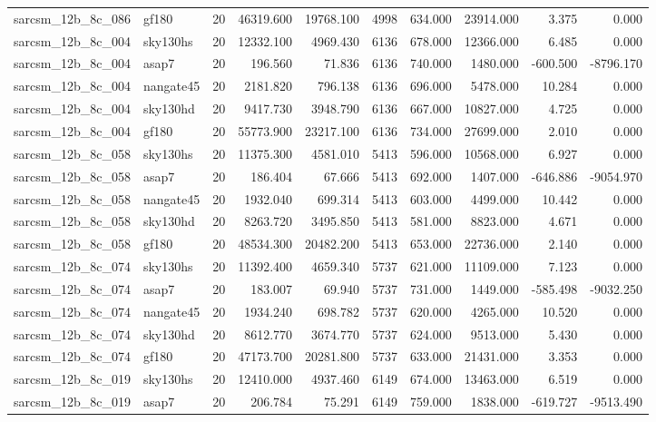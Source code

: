 \documentclass{article}
\begin{document}
\begin{longtable}{llrrrrrrrr}
sarcsm\_12b\_8c\_086 & gf180 & 20 & 46319.600 & 19768.100 & 4998 & 634.000 & 23914.000 & 3.375 & 0.000 \\
sarcsm\_12b\_8c\_004 & sky130hs & 20 & 12332.100 & 4969.430 & 6136 & 678.000 & 12366.000 & 6.485 & 0.000 \\
sarcsm\_12b\_8c\_004 & asap7 & 20 & 196.560 & 71.836 & 6136 & 740.000 & 1480.000 & -600.500 & -8796.170 \\
sarcsm\_12b\_8c\_004 & nangate45 & 20 & 2181.820 & 796.138 & 6136 & 696.000 & 5478.000 & 10.284 & 0.000 \\
sarcsm\_12b\_8c\_004 & sky130hd & 20 & 9417.730 & 3948.790 & 6136 & 667.000 & 10827.000 & 4.725 & 0.000 \\
sarcsm\_12b\_8c\_004 & gf180 & 20 & 55773.900 & 23217.100 & 6136 & 734.000 & 27699.000 & 2.010 & 0.000 \\
sarcsm\_12b\_8c\_058 & sky130hs & 20 & 11375.300 & 4581.010 & 5413 & 596.000 & 10568.000 & 6.927 & 0.000 \\
sarcsm\_12b\_8c\_058 & asap7 & 20 & 186.404 & 67.666 & 5413 & 692.000 & 1407.000 & -646.886 & -9054.970 \\
sarcsm\_12b\_8c\_058 & nangate45 & 20 & 1932.040 & 699.314 & 5413 & 603.000 & 4499.000 & 10.442 & 0.000 \\
sarcsm\_12b\_8c\_058 & sky130hd & 20 & 8263.720 & 3495.850 & 5413 & 581.000 & 8823.000 & 4.671 & 0.000 \\
sarcsm\_12b\_8c\_058 & gf180 & 20 & 48534.300 & 20482.200 & 5413 & 653.000 & 22736.000 & 2.140 & 0.000 \\
sarcsm\_12b\_8c\_074 & sky130hs & 20 & 11392.400 & 4659.340 & 5737 & 621.000 & 11109.000 & 7.123 & 0.000 \\
sarcsm\_12b\_8c\_074 & asap7 & 20 & 183.007 & 69.940 & 5737 & 731.000 & 1449.000 & -585.498 & -9032.250 \\
sarcsm\_12b\_8c\_074 & nangate45 & 20 & 1934.240 & 698.782 & 5737 & 620.000 & 4265.000 & 10.520 & 0.000 \\
sarcsm\_12b\_8c\_074 & sky130hd & 20 & 8612.770 & 3674.770 & 5737 & 624.000 & 9513.000 & 5.430 & 0.000 \\
sarcsm\_12b\_8c\_074 & gf180 & 20 & 47173.700 & 20281.800 & 5737 & 633.000 & 21431.000 & 3.353 & 0.000 \\
sarcsm\_12b\_8c\_019 & sky130hs & 20 & 12410.000 & 4937.460 & 6149 & 674.000 & 13463.000 & 6.519 & 0.000 \\
sarcsm\_12b\_8c\_019 & asap7 & 20 & 206.784 & 75.291 & 6149 & 759.000 & 1838.000 & -619.727 & -9513.490 \\

\end{longtable}
\end{document}
